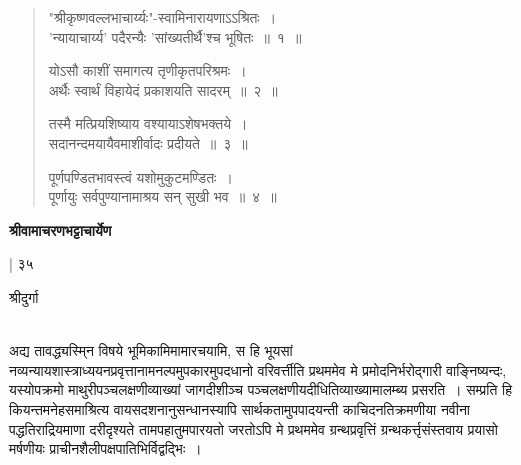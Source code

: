 \documentclass[10pt, openany]{book}
\begin{document}
\begin{quote}
 {\vp  "श्रीकृष्णवल्लभाचार्य्यः"-स्वामिनारायणाऽऽश्रितः~।\\
'न्यायाचार्य्य' पदैरन्यैः 'सांख्यतीर्थै'श्च भूषितः~॥~१~॥

योऽसौ काशीं समागत्य तृणीकृतपरिश्रमः~।\\
अर्थैः स्वार्थं विहायेदं प्रकाशयति सादरम्~॥~२~॥

तस्मै मत्प्रियशिष्याय वश्यायाऽशेषभक्तये~।\\
सदानन्दमयायैवमाशीर्वादः प्रदीयते~॥~३~॥

पूर्णपण्डितभावस्त्वं यशोमुकुटमण्डितः~।\\
पूर्णायुः सर्वपुण्यानामाश्रय सन् सुखी भव~॥~४~॥}
\end{quote}



\begin{flushright}
\la \textbf{श्रीवामाचरणभट्टाचार्येण}
\end{flushright}


\hfill | ३५
\newpage
\onehalfspacing
\begin{center}
 श्रीदुर्गा\\
 \vspace{2mm}
\noindent{}\\
\end{center}
 
अद्य तावद्ध्यस्मि्न विषये भूमिकामिमामारचयामि, स हि भूयसां नव्यन्यायशास्त्राध्ययनप्रवृत्तानामनल्पमुपकारमुपदधानो वरिवर्त्तीति प्रथममेव मे प्रमोदनिर्भरोद्गारी वाङ्निष्यन्दः, यस्योपक्रमो माथुरीपञ्चलक्षणीव्याख्यां जागदीशीञ्च पञ्चलक्षणीयदीधितिव्याख्यामालम्ब्य प्रसरति~। सम्प्रति हि कियन्तमनेहसमाश्रित्य वायसदशनानुसन्धानस्यापि सार्थकतामुपपादयन्ती काचिदनतिक्रमणीया नवीना पद्धतिराद्रियमाणा दरीदृश्यते तामपहातुमपारयतो जरतोऽपि मे प्रथममेव ग्रन्थप्रवृत्तिं ग्रन्थकर्त्तृसंस्तवाय प्रयासो मर्षणीयः
प्राचीनशैलीपक्षपातिभिर्विद्वद्भिः~।\\
\end{document}
